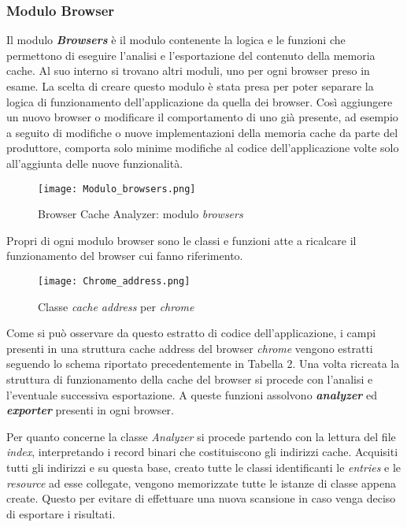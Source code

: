 \subsubsection{Modulo Browser}
Il modulo \textbf{\textit{Browsers}} è il modulo contenente la logica e le funzioni che permettono di eseguire l'analisi e l'esportazione del contenuto della memoria cache. Al suo interno si trovano altri moduli, uno per ogni browser preso in esame. 
La scelta di creare questo modulo è stata presa per poter separare la logica di funzionamento dell'applicazione da quella dei browser. Così aggiungere un nuovo browser o modificare il comportamento di uno già presente, ad esempio a seguito di modifiche o nuove implementazioni della memoria cache da parte del produttore, comporta solo minime modifiche al codice dell'applicazione volte solo all'aggiunta delle nuove funzionalità.

\begin{figure}[htpb]
	\begin{center}
		\texttt{[image: Modulo\_browsers.png]}
	\end{center}
	\caption[Browser Cache Analyzer: modulo \textit{browsers}]{Browser Cache Analyzer: modulo \textit{browsers}}
\end{figure}

\clearpage
Propri di ogni modulo browser sono le classi e funzioni atte a ricalcare il funzionamento del browser cui fanno riferimento. 

\begin{figure}[htpb]
	\begin{center}
		\texttt{[image: Chrome\_address.png]}
	\end{center}
	\caption[Classe \textit{cache address} per \textit{chrome}]{Classe \textit{cache address} per \textit{chrome}}
\end{figure}

Come si può osservare da questo estratto di codice dell'applicazione, i campi presenti in una struttura cache address del browser \textit{chrome} vengono estratti seguendo lo schema riportato precedentemente in Tabella 2. Una volta ricreata la struttura di funzionamento della cache del browser si procede con l'analisi e l'eventuale successiva esportazione. A queste funzioni assolvono \textbf{\textit{analyzer}} ed \textbf{\textit{exporter}}
presenti in ogni browser.

Per quanto concerne la classe \textit{Analyzer} si procede partendo con la lettura del file \textit{index}, interpretando i record binari che costituiscono gli indirizzi cache. Acquisiti tutti gli indirizzi e su questa base, creato tutte le classi identificanti le \textit{entries} e le \textit{resource} ad esse collegate, vengono memorizzate tutte le istanze di classe appena create. Questo per evitare di effettuare una nuova scansione in caso venga deciso di esportare i risultati.

